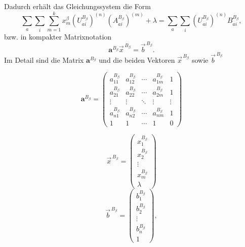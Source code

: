     Dadurch erhält das Gleichungssystem die Form
    \begin{equation}
    \sum_a\sum_i\sum_{m=1}^k x_m^\beta\left(U_{ai}^{B_\beta}\right)^{(n)}\left(A_{ai}^{B_\beta}\right)^{(m)}+\lambda=\sum_a\sum_i\left(U_{ai}^{B_\beta}\right)^{(n)}B_{ai}^{B_\beta},
    \end{equation}
	bzw. in kompakter Matrixnotation
	\begin{equation}
	\boldsymbol{a}^{B_\beta}\vec{x}^{\,B_\beta}=\vec{b}^{\,B_\beta}.
	\end{equation}
	Im Detail sind die Matrix $\boldsymbol{a}^{B_\beta}$ und die beiden Vektoren $\vec{x}^{\,B_\beta}$ sowie $\vec{b}^{\,B_\beta}$
	
	\begin{equation}\label{eq:amat}
	\boldsymbol{a}^{B_\beta}=
	\begin{pmatrix}
		a_{11}^{B_\beta} & a_{12}^{B_\beta} & \cdots & a_{1m}^{B_\beta} & 1 \\
		a_{21}^{B_\beta} & a_{22}^{B_\beta} & \cdots & a_{2m}^{B_\beta} & 1 \\
		\vdots & \vdots & \ddots & \vdots & \vdots\\
		a_{n1}^{B_\beta} & a_{n2}^{B_\beta} & \cdots & a_{nm}^{B_\beta} & 1 \\
		1      & 1      & \cdots & 1      & 0
	\end{pmatrix}
	\end{equation}
	
 	\begin{equation}
	\vec{x}^{\,B_\beta}=
	\begin{pmatrix}
		x_1^{B_\beta}\\
		x_2^{B_\beta}\\
		\vdots\\
		x_m^{B_\beta}\\
		\lambda
	\end{pmatrix}
	\end{equation}
	\begin{equation}\label{eq:bvec}
	\vec{b}^{\,B_\beta}=
	\begin{pmatrix}
		b_1^{B_\beta}\\
		b_2^{B_\beta}\\
		\vdots\\
		b_n^{B_\beta}\\
		1
	\end{pmatrix},
	\end{equation}  	
    
